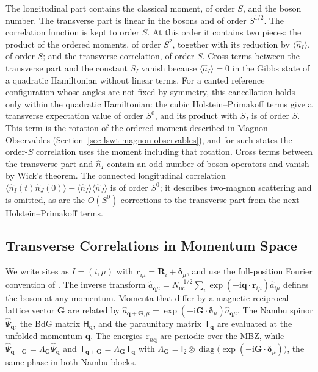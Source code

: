 The longitudinal part contains the classical moment, of order \(S\), and the boson number. The transverse part is linear in the bosons and of order \(S^{1/2}\). The correlation function is kept to order \(S\). At this order it contains two pieces: the product of the ordered moments, of order \(S^2\), together with its reduction by \(\langle\hat n_I\rangle\), of order \(S\); and the transverse correlation, of order \(S\). Cross terms between the transverse part and the constant \(S_I\) vanish because \(\langle\hat a_I\rangle=0\) in the Gibbs state of a quadratic Hamiltonian without linear terms. For a canted reference configuration whose angles are not fixed by symmetry, this cancellation holds only within the quadratic Hamiltonian: the cubic Holstein--Primakoff terms give a transverse expectation value of order \(S^0\), and its product with \(S_I\) is of order \(S\). This term is the rotation of the ordered moment described in Magnon Observables (Section~\ref{sec-lswt-magnon-observables}), and for such states the order-\(S\) correlation uses the moment including that rotation. Cross terms between the transverse part and \(\hat n_I\) contain an odd number of boson operators and vanish by Wick's theorem. The connected longitudinal correlation \(\langle\hat n_I(t)\hat n_J(0)\rangle-\langle\hat n_I\rangle\langle\hat n_J\rangle\) is of order \(S^0\); it describes two-magnon scattering and is omitted, as are the \(O(S^0)\) corrections to the transverse part from the next Holstein--Primakoff terms.

\subsection{Transverse Correlations in Momentum Space}

We write sites as \(I=(i,\mu)\) with \(\mathbf r_{i\mu}=\mathbf R_i+\boldsymbol\delta_\mu\), and use the full-position Fourier convention of . The inverse transform \(\hat a_{\mathbf q\mu}=N_{\mathrm{uc}}^{-1/2}\sum_i\exp(-\mathrm i\mathbf q\cdot\mathbf r_{i\mu})\hat a_{i\mu}\) defines the boson at any momentum. Momenta that differ by a magnetic reciprocal-lattice vector \(\mathbf G\) are related by \(\hat a_{\mathbf q+\mathbf G,\mu}=\exp(-\mathrm i\mathbf G\cdot\boldsymbol\delta_\mu)\hat a_{\mathbf q\mu}\). The Nambu spinor \(\hat\Psi_{\mathbf q}\), the BdG matrix \(\mathsf H_{\mathbf q}\), and the paraunitary matrix \(\mathsf T_{\mathbf q}\) are evaluated at the unfolded momentum \(\mathbf q\). The energies \(\varepsilon_{n\mathbf q}\) are periodic over the MBZ, while \(\hat\Psi_{\mathbf q+\mathbf G}=\Lambda_{\mathbf G}\hat\Psi_{\mathbf q}\) and \(\mathsf T_{\mathbf q+\mathbf G}=\Lambda_{\mathbf G}\mathsf T_{\mathbf q}\) with \(\Lambda_{\mathbf G}=\mathsf I_2\otimes\operatorname{diag}\big(\exp(-\mathrm i\mathbf G\cdot\boldsymbol\delta_\mu)\big)\), the same phase in both Nambu blocks.

